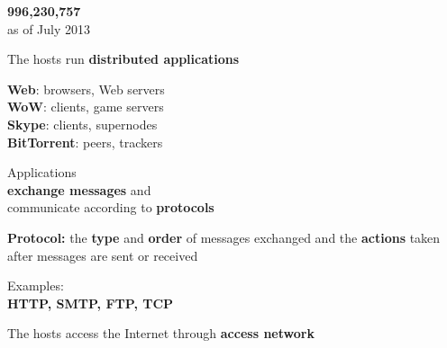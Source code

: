 \begin{frame}
\begin{center}
\Huge
\textbf{996,230,757}\\
\large
as of July 2013
\end{center}
\end{frame}

\begin{frame}\begin{center}
\large
The hosts run \textbf{distributed applications}
\end{center}\end{frame}

\begin{frame}
\large
\textbf{Web}: browsers, Web servers\\
\textbf{WoW}: clients, game servers\\
\textbf{Skype}: clients, supernodes\\
\textbf{BitTorrent}: peers, trackers\\
\end{frame}

\begin{frame}
\begin{center}
\large
Applications\\\textbf{exchange messages} and\\ communicate according to \textbf{protocols}
\end{center}
\end{frame}

\begin{frame}
\begin{center}
\large
\textbf{Protocol:} the \textbf{type} and \textbf{order} of messages exchanged and the \textbf{actions} taken after messages are sent or received
\end{center}
\end{frame}

\begin{frame}
\begin{center}
\large
Examples:\\
\textbf{HTTP, SMTP, FTP, TCP}
\end{center}
\end{frame}

\begin{frame}
\begin{center}
\large
The hosts access the Internet through \textbf{access network}
\end{center}
\end{frame}


